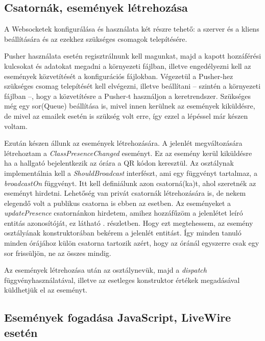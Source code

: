 \documentclass[
]{thesis-ekf}
\theoremstyle{definition}
\theoremstyle{remark}
\begin{document}
\subsection{Csatornák, események létrehozása}

A Websocketek konfigurálása és használata két részre tehető: a szerver és a kliens beállítására és az ezekhez szükséges csomagok telepítésére.

Pusher használata esetén regisztrálnunk kell magunkat, majd a kapott hozzáférési kulcsokat és adatokat megadni a környezeti fájlban, illetve engedélyezni kell az események közvetítését a konfigurációs fájlokban. Végezetül a Pusher-hez szükséges csomag telepítését kell elvégezni, illetve beállítani -- szintén a környezeti fájlban --, hogy a közvetítésre a Pusher-t használjon a keretrendszer. Szükséges még egy sor(Queue) beállítása is, mivel innen kerülnek az események kiküldésre, de mivel az emailek esetén is szükség volt erre, így ezzel a lépéssel már készen voltam.\cite{broadcasting}

Ezután készen állunk az események létrehozására. A jelenlét megváltozására létrehoztam a \emph{ClassPresenceChanged} eseményt. Ez az esemény kerül kiküldésre ha a hallgató bejelentkezik az órára a QR kódon keresztül. Az osztálynak implementálnia kell a \emph{ShouldBroadcast} interfészt, ami egy függvényt tartalmaz, a \emph{broadcastOn} függvényt. Itt kell definiálunk azon csatorná(ka)t, ahol szeretnék az eseményt hirdetni. Lehetőség van privát csatornák létrehozására is, de nekem elegendő volt a publikus csatorna is ebben az esetben. Az eseményeket a \emph{updatePresence} csatornánkon hirdetem, amihez hozzáfűzöm a jelenlétet leíró entitás azonosítóját, ez látható . részletben. Hogy ezt megtehessem, az esemény osztályának konstruktorában bekérem a jelenlét entitást. Így minden tanuló minden órájához külön csatorna tartozik azért, hogy az óránál egyszerre csak egy sor frissüljön, ne az összes mindig.
\pagebreak



Az események létrehozása után az osztálynevük, majd a \emph{dispatch} függvényhasználatával, illetve az esetleges konstruktor értékek megadásával küldhetjük el az eseményt.



\subsection{Események fogadása JavaScript, LiveWire esetén}
\end{document}
